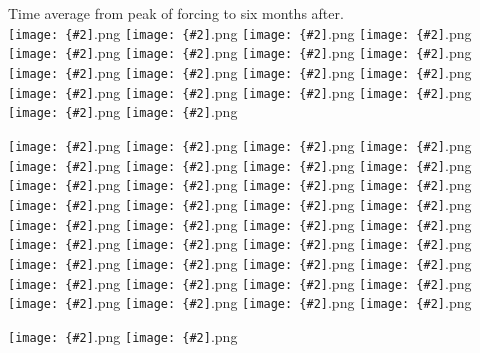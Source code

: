 \documentclass[12pt,a4paper]{article}
\newcommand{\pngfig}[2][0.5]{\texttt{[image: \{\#2]}.png}}
\begin{document}
\section{}

\subsection{}
Time average from peak of forcing to six months after.\\
\pngfig[0.5]{w_lat2.5}
\pngfig[0.5]{w_lat-2.5}
\pngfig[0.5]{w_lat7.5}
\pngfig[0.5]{w_lat-7.5}
\pngfig[0.5]{w_lat12.5}
\pngfig[0.5]{w_lat-12.5}
\pngfig[0.5]{w_lat17.5}
\pngfig[0.5]{w_lat-17.5}
\pngfig[0.5]{w_lat22.5}
\pngfig[0.5]{w_lat-22.5}
\pngfig[0.5]{w_lat27.5}
\pngfig[0.5]{w_lat-27.5}
\pngfig[0.5]{w_lat32.5}
\pngfig[0.5]{w_lat-32.5}
\pngfig[0.5]{w_lat37.5}
\pngfig[0.5]{w_lat-37.5}
\pngfig[0.5]{w_lat42.5}
\pngfig[0.5]{w_lat-42.5}

\noindent\pngfig[0.25]{gpht_lat2.5}
\pngfig[0.25]{gpht_lat-2.5}
\pngfig[0.25]{gpht_lat2.5_min}
\pngfig[0.25]{gpht_lat-2.5_min}
\pngfig[0.25]{gpht_lat7.5}
\pngfig[0.25]{gpht_lat-7.5}
\pngfig[0.25]{gpht_lat7.5_min}
\pngfig[0.25]{gpht_lat-7.5_min}
\pngfig[0.25]{gpht_lat12.5}
\pngfig[0.25]{gpht_lat-12.5}
\pngfig[0.25]{gpht_lat12.5_min}
\pngfig[0.25]{gpht_lat-12.5_min}
\pngfig[0.25]{gpht_lat17.5}
\pngfig[0.25]{gpht_lat-17.5}
\pngfig[0.25]{gpht_lat17.5_min}
\pngfig[0.25]{gpht_lat-17.5_min}
\pngfig[0.25]{gpht_lat22.5}
\pngfig[0.25]{gpht_lat-22.5}
\pngfig[0.25]{gpht_lat22.5_min}
\pngfig[0.25]{gpht_lat-22.5_min}
\pngfig[0.25]{gpht_lat27.5}
\pngfig[0.25]{gpht_lat-27.5}
\pngfig[0.25]{gpht_lat27.5_min}
\pngfig[0.25]{gpht_lat-27.5_min}
\pngfig[0.25]{gpht_lat32.5}
\pngfig[0.25]{gpht_lat-32.5}
\pngfig[0.25]{gpht_lat32.5_min}
\pngfig[0.25]{gpht_lat-32.5_min}
\pngfig[0.25]{gpht_lat37.5}
\pngfig[0.25]{gpht_lat-37.5}
\pngfig[0.25]{gpht_lat37.5_min}
\pngfig[0.25]{gpht_lat-37.5_min}
\pngfig[0.25]{gpht_lat42.5}
\pngfig[0.25]{gpht_lat-42.5}
\pngfig[0.25]{gpht_lat42.5_min}
\pngfig[0.25]{gpht_lat-42.5_min}


\pngfig[0.5]{comp_Pmax_sfc}
\pngfig[0.5]{comp_Pmin_sfc}

\end{document}

